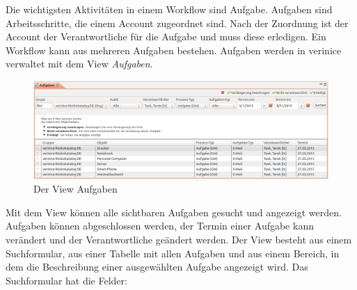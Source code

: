 \documentclass[a4paper,10pt]{book}
\begin{document}
Die wichtigsten Aktivitäten in einem Workflow sind Aufgabe. Aufgaben sind Arbeitsschritte, die einem Account zugeordnet sind. Nach der Zuordnung ist der Account der Verantwortliche für die Aufgabe und muss diese erledigen. Ein Workflow kann aus mehreren Aufgaben bestehen. Aufgaben werden in verinice verwaltet mit dem View \textit{Aufgaben}.
\begin{figure}[htb!]
  \centering
  \includegraphics[scale=.26]{Screenshot/Task_view_screenshot-de.png}
  \caption{\label{fig:view-aufgaben} Der View Aufgaben}
\end{figure}
Mit dem View können alle sichtbaren Aufgaben gesucht und angezeigt werden. Aufgaben können abgeschlossen werden, der Termin einer Aufgabe kann verändert und der Verantwortliche geändert werden. Der View besteht aus einem Suchformular, aus einer Tabelle mit allen Aufgaben und aus einem Bereich, in dem die Beschreibung einer ausgewählten Aufgabe angezeigt wird. Das Suchformular hat die Felder:
\end{document}
